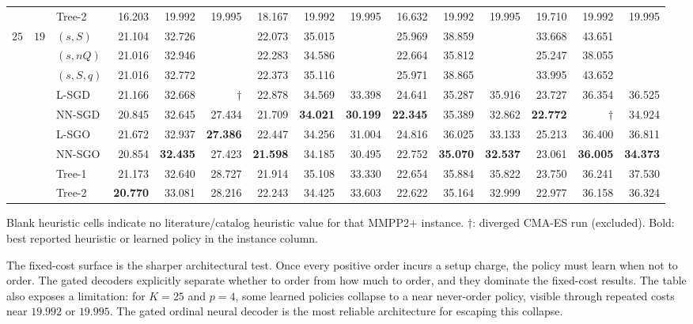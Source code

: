 \documentclass[authoryear,11pt]{elsarticle}
\begin{document}
\begin{table}[!htbp]
{\begin{tabular}{lllrrrrrrrrrrrr}
 &  & Tree-2 & 16.203 & 19.992 & 19.995 & 18.167 & 19.992 & 19.995 & 16.632 & 19.992 & 19.995 & 19.710 & 19.992 & 19.995 \\
\addlinespace
$25$ & $19$ & $(s,S)$ & 21.104 & 32.726 &  & 22.073 & 35.015 &  & 25.969 & 38.859 &  & 33.668 & 43.651 &  \\
 &  & $(s,nQ)$ & 21.016 & 32.946 &  & 22.283 & 34.586 &  & 22.664 & 35.812 &  & 25.247 & 38.055 &  \\
 &  & $(s,S,q)$ & 21.016 & 32.772 &  & 22.373 & 35.116 &  & 25.971 & 38.865 &  & 33.995 & 43.652 &  \\
 &  & L-SGD & 21.166 & 32.668 & $\dagger$ & 22.878 & 34.569 & 33.398 & 24.641 & 35.287 & 35.916 & 23.727 & 36.354 & 36.525 \\
 &  & NN-SGD & 20.845 & 32.645 & 27.434 & 21.709 & \textbf{34.021} & \textbf{30.199} & \textbf{22.345} & 35.389 & 32.862 & \textbf{22.772} & $\dagger$ & 34.924 \\
 &  & L-SGO & 21.672 & 32.937 & \textbf{27.386} & 22.447 & 34.256 & 31.004 & 24.816 & 36.025 & 33.133 & 25.213 & 36.400 & 36.811 \\
 &  & NN-SGO & 20.854 & \textbf{32.435} & 27.423 & \textbf{21.598} & 34.185 & 30.495 & 22.752 & \textbf{35.070} & \textbf{32.537} & 23.061 & \textbf{36.005} & \textbf{34.373} \\
 &  & Tree-1 & 21.173 & 32.640 & 28.727 & 21.914 & 35.108 & 33.330 & 22.654 & 35.884 & 35.822 & 23.750 & 36.241 & 37.530 \\
 &  & Tree-2 & \textbf{20.770} & 33.081 & 28.216 & 22.243 & 34.425 & 33.603 & 22.622 & 35.164 & 32.999 & 22.977 & 36.158 & 36.324 \\
\bottomrule
\end{tabular}}
\par\medskip\footnotesize Blank heuristic cells indicate no literature/catalog heuristic value for that MMPP2$+$ instance. $\dagger$: diverged CMA-ES run (excluded). Bold: best reported heuristic or learned policy in the instance column.
\end{table}
\FloatBarrier


The fixed-cost surface is the sharper architectural test. Once every positive order incurs a setup charge, the policy must learn when not to order. The gated decoders explicitly separate whether to order from how much to order, and they dominate the fixed-cost results. The table also exposes a limitation: for $K=25$ and $p=4$, some learned policies collapse to a near never-order policy, visible through repeated costs near $19.992$ or $19.995$. The gated ordinal neural decoder is the most reliable architecture for escaping this collapse.
\end{document}
